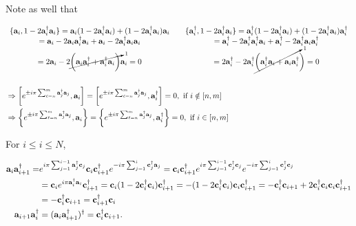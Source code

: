 \documentclass{homework}
\begin{document}
Note as well that

\begin{equation}
\begin{split}
&\begin{array}{ccc}
     \{{\bf a}_i, 1 - 2{\bf a}_i^\dagger {\bf a}_i\} = {\bf a}_i (1-2{\bf a}_i^\dagger {\bf a}_i) + (1-2{\bf a}_i^\dagger {\bf a}_i) {\bf a}_i &  & \{{\bf a}_i^\dagger, 1 - 2{\bf a}_i^\dagger {\bf a}_i\} = {\bf a}_i^\dagger (1-2{\bf a}_i^\dagger {\bf a}_i) + (1-2{\bf a}_i^\dagger {\bf a}_i) {\bf a}_i^\dagger \\
     = {\bf a}_i - 2 {\bf a}_i {\bf a}_i^\dagger {\bf a}_i + {\bf a}_i - 2 {\bf a}_i^\dagger {\bf a}_i {\bf a}_i & & = {\bf a}_i^\dagger - 2 {\bf a}_i^\dagger {\bf a}_i^\dagger {\bf a}_i + {\bf a}_i^\dagger - 2 {\bf a}_i^\dagger {\bf a}_i {\bf a}_i^\dagger \\
     = 2{\bf a}_i - 2 \cancelto{1}{\bigg({\bf a}_i {\bf a}_i^\dagger + {\bf a}_i^\dagger {\bf a}_i\bigg)} {\bf a}_i = 0 &  & = 2{\bf a}_i^\dagger - 2 {\bf a}_i^\dagger \cancelto{1}{\bigg( {\bf a}_i^\dagger {\bf a}_i + {\bf a}_i {\bf a}_i^\dagger}\bigg) = 0
\end{array} \\
\\
&\Rightarrow \bigg[e^{\pm i \pi \sum_{\ell = n}^{m} {\bf a}_j^\dagger {\bf a}_j}, {\bf a}_i\bigg] = \bigg[e^{\pm i \pi \sum_{\ell = n}^{m} {\bf a}_j^\dagger {\bf a}_j}, {\bf a}_i^\dagger\bigg] = 0, \textnormal{ if } i \notin [n, m] \\
&\Rightarrow \bigg\{e^{\pm i \pi \sum_{\ell = n}^{m} {\bf a}_j^\dagger {\bf a}_j}, {\bf a}_i\bigg\} = \bigg\{e^{\pm i \pi \sum_{\ell = n}^{m} {\bf a}_j^\dagger {\bf a}_j}, {\bf a}_i^\dagger\bigg\} = 0, \textnormal{ if } i \in [n, m]
\end{split}
\end{equation}

For $i \leq i \leq N$,

\begin{equation}
    \begin{split}
{\bf a}_i {\bf a}_{i+1}^\dagger =& e^{i\pi \sum_{j=1}^{i-1} {\bf a}_j^\dagger {\bf c}_j} {\bf c}_i  {\bf c}_{i+1}^\dagger e^{-i\pi \sum_{j=1}^{i} {\bf c}_j^\dagger {\bf a}_j} = {\bf c}_i  {\bf c}_{i+1}^\dagger e^{i\pi \sum_{j=1}^{i-1} {\bf c}_j^\dagger {\bf c}_j} e^{-i\pi \sum_{j=1}^{i} {\bf c}_j^\dagger {\bf c}_j} \\
        &= {\bf c}_i e^{i \pi {\bf a}_i^\dagger {\bf a}_i} {\bf c}_{i+1}^\dagger = {\bf c}_i (1- 2{\bf c}_i^\dagger {\bf c}_i){\bf c}_{i+1}^\dagger = -(1- 2{\bf c}_i^\dagger {\bf c}_i) {\bf c}_i {\bf c}_{i+1}^\dagger = -{\bf c}_i^\dagger {\bf c}_{i+1} + 2{\bf c}_i^\dagger {\bf c}_i {\bf c}_i {\bf c}_{i+1}^\dagger  \\
        &= -{\bf c}_i^\dagger {\bf c}_{i+1} = {\bf c}_{i+1}^\dagger {\bf c}_{i} \\
        {\bf a}_{i+1} {\bf a}_{i}^\dagger &= ({\bf a}_i {\bf a}_{i+1}^\dagger)^\dagger = {\bf c}_i^\dagger {\bf c}_{i+1}.
    \end{split}
\end{equation}
\end{document}

